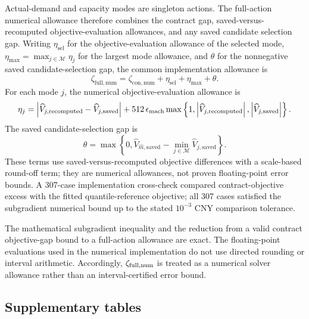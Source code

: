 \documentclass[]{interact}
\begin{document}
Actual-demand and capacity modes are singleton actions. The full-action
numerical allowance therefore combines the contract gap, saved-versus-
recomputed objective-evaluation allowances, and any saved candidate
selection gap. Writing $\eta_{\mathrm{sel}}$ for the objective-evaluation
allowance of the selected mode, $\eta_{\max}=\max_{j\in\mathcal M}\eta_j$
for the largest mode allowance, and $\theta$ for the nonnegative saved
candidate-selection gap, the common implementation allowance is
\[
\zeta_{\mathrm{full,num}}
=\zeta_{\mathrm{con,num}}
+\eta_{\mathrm{sel}}+\eta_{\max}+\theta.
\]
For each mode $j$, the numerical objective-evaluation allowance is
\[
\eta_j
=
\left|\widehat V_{j,\mathrm{recomputed}}-\widehat V_{j,\mathrm{saved}}\right|
+512\,\epsilon_{\rm mach}
\max\left\{1,
\left|\widehat V_{j,\mathrm{recomputed}}\right|,
\left|\widehat V_{j,\mathrm{saved}}\right|
\right\}.
\]
The saved candidate-selection gap is
\[
\theta=\max\left\{0,
\widehat V_{\widehat m,\mathrm{saved}}
-\min_{j\in\mathcal M}\widehat V_{j,\mathrm{saved}}
\right\}.
\]These terms use saved-versus-recomputed objective differences with a
scale-based round-off term; they are numerical allowances, not proven
floating-point error bounds. A 307-case implementation cross-check
compared contract-objective excess with the fitted quantile-reference
objective; all 307 cases satisfied the subgradient numerical bound up
to the stated $10^{-3}$ CNY comparison tolerance.

The mathematical subgradient inequality and the reduction from a valid
contract objective-gap bound to a full-action allowance are exact. The
floating-point evaluations used in the numerical implementation do not
use directed rounding or interval arithmetic. Accordingly,
$\zeta_{\rm full,num}$ is treated as a numerical solver allowance
rather than an interval-certified error bound.

\clearpage

\clearpage
\subsection*{Supplementary tables}


\FloatBarrier


\FloatBarrier


\FloatBarrier


\FloatBarrier


\FloatBarrier
\end{document}
